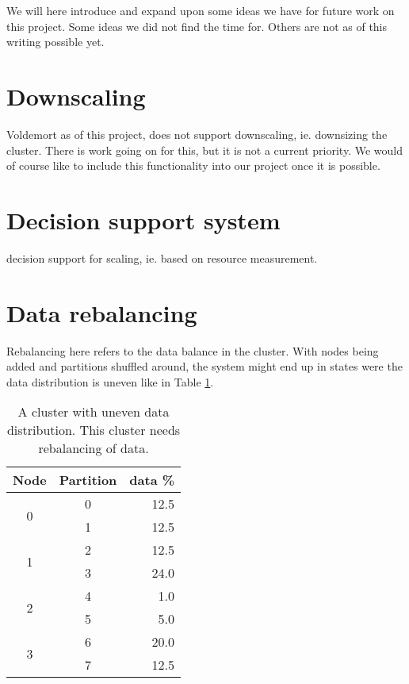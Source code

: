 
We will here introduce and expand upon some ideas we have for future work on this project. Some ideas we did not find the time for. Others are not as of this writing possible yet.

\section{Downscaling}
Voldemort as of this project, does not support downscaling, ie. downsizing the cluster. There is work going on for this, but it is not a current priority. We would of course like to include this functionality into our project once it is possible.


\section{Decision support system}
decision support for scaling, ie. based on resource measurement.

\section{Data rebalancing}
Rebalancing here refers to the data balance in the cluster. With nodes being added and partitions shuffled around, the system might end up in states were the data distribution is uneven like in Table \ref{tbl:datarebalance}.
\begin{center}
\begin{table}[h]
	\begin{tabular}{|c|c|r|}

		\multicolumn{1}{c}{Node} & 
		\multicolumn{1}{c}{Partition } & 
		\multicolumn{1}{c}{data \%} \\
		\hline

		\multirow{2}{*}{0} & 0 & 12.5 \\ \cline{2-3}
		 & 1 & 12.5 \\
		 \hline
		\multirow{2}{*}{1} & 2 & 12.5 \\ \cline{2-3}
		 & 3 & 24.0 \\
 		 \hline

		\multirow{2}{*}{2} & 4 & 1.0 \\ \cline{2-3}
		 & 5 & 5.0 \\
		
		\hline	
		
		\multirow{2}{*}{3} & 6 & 20.0 \\ \cline{2-3}
		 & 7 & 12.5 \\

		\hline
	\end{tabular}
	\caption{A cluster with uneven data distribution. This cluster needs rebalancing of data.}
	\label{tbl:datarebalance}
\end{table}
\end{center}

